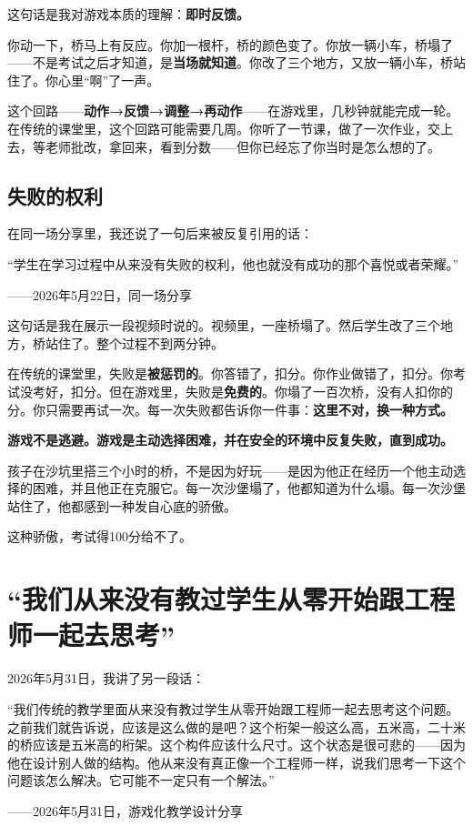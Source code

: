 这句话是我对游戏本质的理解：\textbf{即时反馈。}

你动一下，桥马上有反应。你加一根杆，桥的颜色变了。你放一辆小车，桥塌了——不是考试之后才知道，是\textbf{当场就知道}。你改了三个地方，又放一辆小车，桥站住了。你心里``啊''了一声。

这个回路——\textbf{动作→反馈→调整→再动作}——在游戏里，几秒钟就能完成一轮。在传统的课堂里，这个回路可能需要几周。你听了一节课，做了一次作业，交上去，等老师批改，拿回来，看到分数——但你已经忘了你当时是怎么想的了。

\subsection{失败的权利}

在同一场分享里，我还说了一句后来被反复引用的话：

\begin{shiyu-inline}
``学生在学习过程中从来没有失败的权利，他也就没有成功的那个喜悦或者荣耀。''

\hfill ——2026年5月22日，同一场分享
\end{shiyu-inline}

这句话是我在展示一段视频时说的。视频里，一座桥塌了。然后学生改了三个地方，桥站住了。整个过程不到两分钟。

在传统的课堂里，失败是\textbf{被惩罚的}。你答错了，扣分。你作业做错了，扣分。你考试没考好，扣分。但在游戏里，失败是\textbf{免费的}。你塌了一百次桥，没有人扣你的分。你只需要再试一次。每一次失败都告诉你一件事：\textbf{这里不对，换一种方式。}

\begin{insight}
\label{insight:chap2}

\textbf{游戏不是逃避。游戏是主动选择困难，并在安全的环境中反复失败，直到成功。}

孩子在沙坑里搭三个小时的桥，不是因为好玩——是因为他正在经历一个他主动选择的困难，并且他正在克服它。每一次沙堡塌了，他都知道为什么塌。每一次沙堡站住了，他都感到一种发自心底的骄傲。

这种骄傲，考试得100分给不了。
\end{insight}

\section{``我们从来没有教过学生从零开始跟工程师一起去思考''}

2026年5月31日，我讲了另一段话：

\begin{shiyu-inline}
``我们传统的教学里面从来没有教过学生从零开始跟工程师一起去思考这个问题。之前我们就告诉说，应该是这么做的是吧？这个桁架一般这么高，五米高，二十米的桥应该是五米高的桁架。这个构件应该什么尺寸。这个状态是很可悲的——因为他在设计别人做的结构。他从来没有真正像一个工程师一样，说我们思考一下这个问题该怎么解决。它可能不一定只有一个解法。''

\hfill ——2026年5月31日，游戏化教学设计分享
\end{shiyu-inline}

